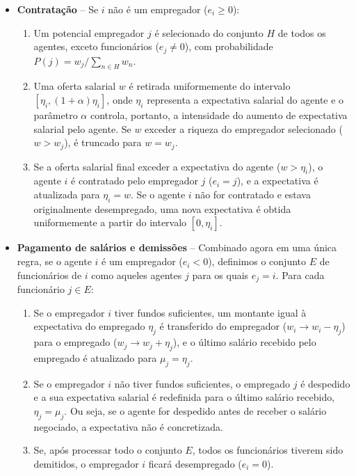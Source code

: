 \begin{itemize}
\item \textbf{Contratação} -- Se $i$ não é um empregador ($e_i\geq0$):
\begin{enumerate}
    \item Um potencial empregador $j$ é selecionado do conjunto $H$  de todos os agentes, exceto funcionários ($e_j\neq0$), com probabilidade  $P (j)= w_{j}/\sum_{n\in H}w_{n}$.

     \item Uma oferta salarial $w$ é retirada uniformemente do intervalo $\left[\eta_{i},\left(1+\alpha\right)\eta_{i}\right]$,    onde $\eta_i$ representa a expectativa salarial do agente e o parâmetro $\alpha$ controla, portanto, a intensidade do aumento de expectativa salarial pelo agente.  Se $w$ exceder a riqueza do empregador selecionado ($w>w_j$), é truncado para $w=w_j$.

    \item Se a oferta salarial final exceder a expectativa do agente ($w > \eta_i$), o agente $i$ é contratado pelo empregador $j$ ($e_i = j$), e a expectativa é atualizada para $\eta_i = w$. Se o agente $i$ não for contratado e estava originalmente desempregado, uma nova expectativa é obtida uniformemente a partir do intervalo $\left[0, \eta_i\right]$.
  
\end{enumerate}

\item \textbf{Pagamento de salários e demissões} -- Combinado agora em uma única regra, se o agente $i$ é um empregador ($e_i < 0$), definimos o conjunto $E$ de funcionários de $i$ como aqueles agentes $j$ para os quais $e_j = i$. Para cada funcionário $j \in E$:


\begin{enumerate}
    \item Se o empregador $i$ tiver fundos suficientes, um montante igual à expectativa do empregado $\eta_j$ é transferido do empregador ($w_i \rightarrow  w_i- \eta_j$) para o empregado ($w_j \rightarrow w_j +\eta_j$), e o último salário recebido pelo empregado é atualizado para $\mu_j = \eta_j$.
    
    \item Se o empregador $i$ não tiver fundos suficientes, o empregado $j$ é despedido e a sua expectativa salarial é redefinida para o último salário recebido, $\eta_j = \mu_j$. Ou seja, se o agente for despedido antes de receber o salário negociado, a expectativa não é concretizada. 

    \item Se, após processar todo o conjunto $E$, todos os funcionários tiverem sido demitidos, o empregador $i$ ficará desempregado ($e_i = 0$).

\end{enumerate}
\end{itemize} 

